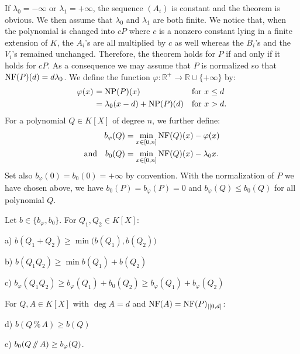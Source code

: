 \documentclass{sig-alternate-2013}
\DeclareMathOperator{\NP}{NP}
\newcommand{\R}{\mathbb R}
\newcommand{\NF}{\text{\rm NF}}
\renewcommand{\mod}{\,\%\,}
\renewcommand{\div}{\,/\hspace{-0.3em}/\,}
\begin{document}
If $\lambda_0 = -\infty$ or $\lambda_1 = +\infty$, the sequence $(A_i)$
is constant and the theorem is obvious. We then assume that $\lambda_0$
and $\lambda_1$ are both finite.
We notice that, when the polynomial is changed into $cP$ where $c$ is a 
nonzero constant lying in a finite extension of $K$, the $A_i$'s are all 
multiplied by $c$ as well whereas the $B_i$'s and the $V_i$'s remained 
unchanged. Therefore, the theorem holds for $P$ if and only if it holds 
for $cP$. As a consequence we may assume that $P$ is normalized so that 
$\NF(P)(d) = d \lambda_0$. We define the function $\varphi : \R^+ \to \R 
\cup \{+\infty\}$ by:
\begin{equation}
\label{eqdef:functionphi}
\begin{array}{r@{\,\,}ll}
\varphi(x) & = \NP(P)(x) & \text{for } x \leq d \smallskip \\
& = \lambda_0 (x-d) + \NP(P)(d) & \text{for } x > d.
\end{array}
\end{equation}
For a polynomial $Q \in K[X]$ of degree $n$, we further define:
\begin{align}
b_\varphi(Q) & = \min_{x \in [0,n]} \NF(Q)(x) - \varphi(x) 
\label{eqdef:bphi} \\
\text{and} \quad
b_0(Q) & = \min_{x \in [0,n]} \NF(Q)(x) - \lambda_0 x.
\label{eqdef:b0}
\end{align}
Set also $b_\varphi(0) = b_0(0) = +\infty$ by convention.
With the normalization of $P$ we have chosen above, we have $b_0(P)
= b_\varphi(P) = 0$ and $b_\varphi(Q) \leq b_0(Q)$ for all polynomial
$Q$. 

\begin{lem}
\label{lem:bphib0}
Let $b \in \{b_\varphi, b_0\}$. For $Q_1, Q_2 \in K[X]$:

\smallskip

a) $b(Q_1+Q_2) \geq \min \big(b(Q_1), b(Q_2)\big)$

\smallskip

b) $b(Q_1Q_2) \geq \min b(Q_1) + b(Q_2)$ 

\smallskip

c) $b_\varphi(Q_1 Q_2) \geq b_\varphi(Q_1) + b_0(Q_2) \geq
b_\varphi(Q_1) + b_\varphi(Q_2)$

\smallskip

\noindent
For $Q, A \in K[X]$ with $\deg A = d$ and $\NF(A) =
\NF(P)_{|[0,d]}$:

\smallskip

d) $b(Q \mod A) \geq b(Q)$

\smallskip

e) $b_0(Q \div A) \geq b_\varphi(Q)$.
\end{lem}
\end{document}
